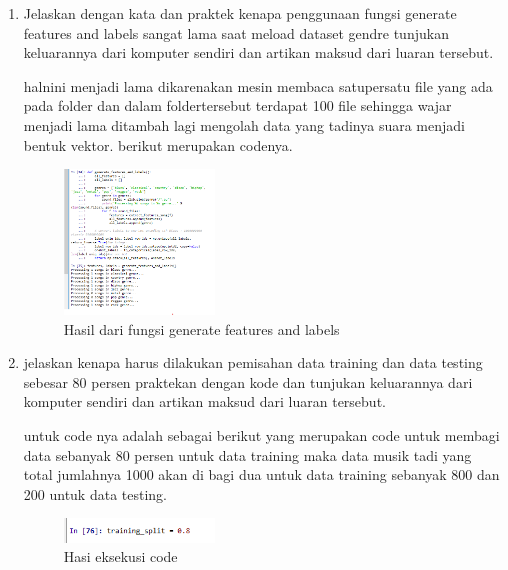 \begin{enumerate}
    \item Jelaskan dengan kata dan praktek kenapa penggunaan fungsi generate features and labels sangat lama saat meload dataset gendre tunjukan keluarannya dari komputer sendiri dan artikan maksud dari luaran tersebut.\par
    
    halnini menjadi lama dikarenakan mesin membaca satupersatu file yang ada pada folder dan dalam foldertersebut terdapat 100 file sehingga wajar menjadi lama ditambah lagi mengolah data yang tadinya suara menjadi bentuk vektor. berikut merupakan codenya.
    

    
    \begin{figure}[H]
          \centering
          \includegraphics[width=4cm]{figures/1174035/chapter6/praktek_2.png}
          \caption{Hasil dari fungsi generate features and labels}
          
          \end{figure}
    
  
    
    \item jelaskan kenapa harus dilakukan pemisahan data training dan data testing sebesar 80 persen praktekan dengan kode dan tunjukan keluarannya dari komputer sendiri dan artikan maksud dari luaran tersebut. 
    
    untuk code nya adalah sebagai berikut  yang merupakan code untuk membagi data sebanyak 80 persen untuk data training maka data musik tadi yang total jumlahnya 1000 akan di bagi dua untuk data training sebanyak 800  dan 200 untuk data testing.
    
    
    
 
    \begin{figure}[H]
          \centering
            \includegraphics[width=4cm]
          {figures/1174035/chapter6//praktek_3.png}
          \caption{Hasi eksekusi code}
          

\end{figure}
\end{enumerate}
